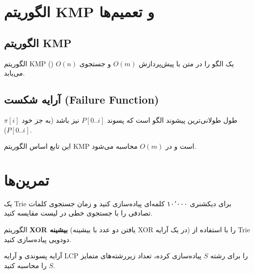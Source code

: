 \documentclass{matinbook}
\begin{document}
    \section{الگوریتم KMP و تعمیم‌ها}
    
    \subsection{الگوریتم KMP}
    
    الگوریتم KMP
    ()
    یک الگو را در متن با
    پیش‌پردازش $O(m)$ و
    جستجوی $O(n)$ می‌یابد.
    
    \subsection{آرایه شکست (Failure Function)}
    
    \begin{definition}
        $\pi[i]$ طول طولانی‌ترین پیشوند
        الگو است که پسوند $P[0..i]$ نیز باشد
        (به جز خود $P[0..i]$).
        \label{def:prefix-function}
    \end{definition}
    
    این تابع اساس الگوریتم KMP است
    و در $O(m)$ محاسبه می‌شود.
    
    \section{تمرین‌ها}
    
    \begin{exercise}
        یک Trie برای دیکشنری ۱۰٬۰۰۰ کلمه‌ای
        پیاده‌سازی کنید و زمان جستجوی
        کلمات تصادفی را با جستجوی خطی
        در لیست مقایسه کنید.
        \label{exc:trie-benchmark}
    \end{exercise}
    
    \begin{exercise}
        الگوریتم \textbf{XOR بیشینه}
        (یافتن دو عدد با بیشینه XOR
        در یک آرایه) را با استفاده از
        Trie دودویی پیاده‌سازی کنید.
        \label{exc:max-xor}
    \end{exercise}
    
    \begin{exercise}
        آرایه پسوندی و آرایه LCP را
        برای رشته $S$ پیاده‌سازی کرده،
        تعداد زیررشته‌های متمایز $S$
        را محاسبه کنید.
        \label{exc:suffix-array}
    \end{exercise}
    
\end{document}
